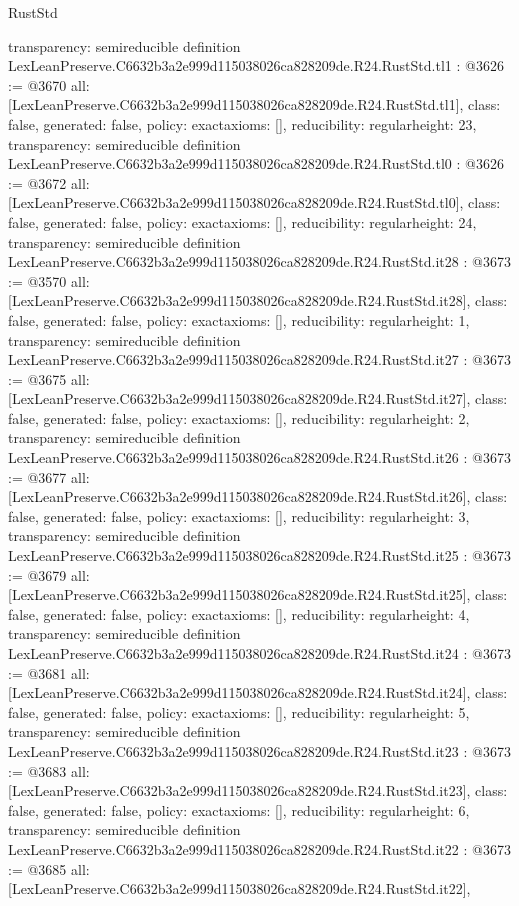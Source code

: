 \begin{lexlean}{RustStd}
\begin{coremodule}
{  transparency: semireducible
}
definition LexLeanPreserve.C6632b3a2e999d115038026ca828209de.R24.RustStd.tl1 : @3626 := @3670 {
  all: [LexLeanPreserve.C6632b3a2e999d115038026ca828209de.R24.RustStd.tl1],
  class: false,
  generated: false,
  policy: exact{axioms: []},
  reducibility: regular{height: 23},
  transparency: semireducible
}
definition LexLeanPreserve.C6632b3a2e999d115038026ca828209de.R24.RustStd.tl0 : @3626 := @3672 {
  all: [LexLeanPreserve.C6632b3a2e999d115038026ca828209de.R24.RustStd.tl0],
  class: false,
  generated: false,
  policy: exact{axioms: []},
  reducibility: regular{height: 24},
  transparency: semireducible
}
definition LexLeanPreserve.C6632b3a2e999d115038026ca828209de.R24.RustStd.it28 : @3673 := @3570 {
  all: [LexLeanPreserve.C6632b3a2e999d115038026ca828209de.R24.RustStd.it28],
  class: false,
  generated: false,
  policy: exact{axioms: []},
  reducibility: regular{height: 1},
  transparency: semireducible
}
definition LexLeanPreserve.C6632b3a2e999d115038026ca828209de.R24.RustStd.it27 : @3673 := @3675 {
  all: [LexLeanPreserve.C6632b3a2e999d115038026ca828209de.R24.RustStd.it27],
  class: false,
  generated: false,
  policy: exact{axioms: []},
  reducibility: regular{height: 2},
  transparency: semireducible
}
definition LexLeanPreserve.C6632b3a2e999d115038026ca828209de.R24.RustStd.it26 : @3673 := @3677 {
  all: [LexLeanPreserve.C6632b3a2e999d115038026ca828209de.R24.RustStd.it26],
  class: false,
  generated: false,
  policy: exact{axioms: []},
  reducibility: regular{height: 3},
  transparency: semireducible
}
definition LexLeanPreserve.C6632b3a2e999d115038026ca828209de.R24.RustStd.it25 : @3673 := @3679 {
  all: [LexLeanPreserve.C6632b3a2e999d115038026ca828209de.R24.RustStd.it25],
  class: false,
  generated: false,
  policy: exact{axioms: []},
  reducibility: regular{height: 4},
  transparency: semireducible
}
definition LexLeanPreserve.C6632b3a2e999d115038026ca828209de.R24.RustStd.it24 : @3673 := @3681 {
  all: [LexLeanPreserve.C6632b3a2e999d115038026ca828209de.R24.RustStd.it24],
  class: false,
  generated: false,
  policy: exact{axioms: []},
  reducibility: regular{height: 5},
  transparency: semireducible
}
definition LexLeanPreserve.C6632b3a2e999d115038026ca828209de.R24.RustStd.it23 : @3673 := @3683 {
  all: [LexLeanPreserve.C6632b3a2e999d115038026ca828209de.R24.RustStd.it23],
  class: false,
  generated: false,
  policy: exact{axioms: []},
  reducibility: regular{height: 6},
  transparency: semireducible
}
definition LexLeanPreserve.C6632b3a2e999d115038026ca828209de.R24.RustStd.it22 : @3673 := @3685 {
  all: [LexLeanPreserve.C6632b3a2e999d115038026ca828209de.R24.RustStd.it22],
}
\end{coremodule}
\end{lexlean}
